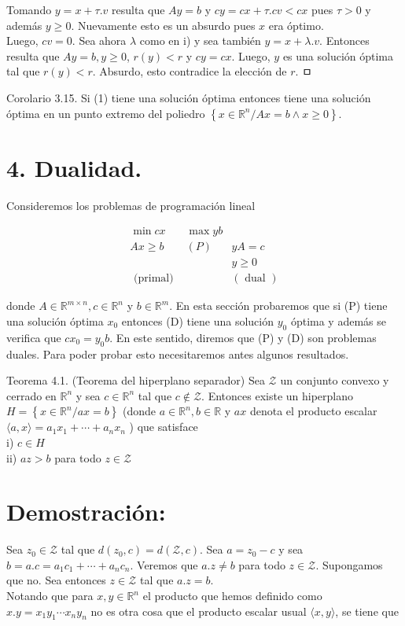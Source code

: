 \documentclass[10pt]{article}
\begin{document}
Tomando $y=x+\tau . v$ resulta que $A y=b$ y $c y=c x+\tau . c v<c x$ pues $\tau>0$ y además $y \geq 0$. Nuevamente esto es un absurdo pues $x$ era óptimo.\\
Luego, $c v=0$. Sea ahora $\lambda$ como en i) y sea también $y=x+\lambda . v$. Entonces resulta que $A y=b, y \geq 0$, $r(y)<r$ y $c y=c x$. Luego, $y$ es una solución óptima tal que $r(y)<r$. Absurdo, esto contradice la elección de $r$. ㅁ

Corolario 3.15. Si (1) tiene una solución óptima entonces tiene una solución óptima en un punto extremo del poliedro $\left\{x \in \mathbb{R}^{n} / A x=b \wedge x \geq 0\right\}$.

\section*{4. Dualidad.}
Consideremos los problemas de programación lineal

\[
\begin{array}{ccc}
\min c x & \max y b \\
A x \geq b & (P) & y A=c  \tag{D}\\
& & y \geq 0 \\
\text { (primal) } & & (\text { dual })
\end{array}
\]

donde $A \in \mathbb{R}^{m \times n}, c \in \mathbb{R}^{n}$ y $b \in \mathbb{R}^{m}$. En esta sección probaremos que si (P) tiene una solución óptima $x_{0}$ entonces (D) tiene una solución $y_{0}$ óptima y además se verifica que $c x_{0}=y_{0} b$. En este sentido, diremos que (P) y (D) son problemas duales. Para poder probar esto necesitaremos antes algunos resultados.

Teorema 4.1. (Teorema del hiperplano separador) Sea $\mathcal{Z}$ un conjunto convexo y cerrado en $\mathbb{R}^{n}$ y sea $c \in \mathbb{R}^{n}$ tal que $c \notin \mathcal{Z}$. Entonces existe un hiperplano $H=\left\{x \in \mathbb{R}^{n} / a x=b\right\}$ (donde $a \in \mathbb{R}^{n}, b \in \mathbb{R}$ y $a x$ denota el producto escalar $\langle a, x\rangle=a_{1} x_{1}+\cdots+a_{n} x_{n}$ ) que satisface\\
i) $c \in H$\\
ii) $a z>b$ para todo $z \in \mathcal{Z}$

\section*{Demostración:}
Sea $z_{0} \in \mathcal{Z}$ tal que $d\left(z_{0}, c\right)=d(\mathcal{Z}, c)$. Sea $a=z_{0}-c$ y sea $b=a . c=a_{1} c_{1}+\cdots+a_{n} c_{n}$. Veremos que $a . z \neq b$ para todo $z \in \mathcal{Z}$. Supongamos que no. Sea entonces $z \in \mathcal{Z}$ tal que $a . z=b$.\\
Notando que para $x, y \in \mathbb{R}^{n}$ el producto que hemos definido como $x . y=x_{1} y_{1} \cdots x_{n} y_{n}$ no es otra cosa que el producto escalar usual $\langle x, y\rangle$, se tiene que
\end{document}
